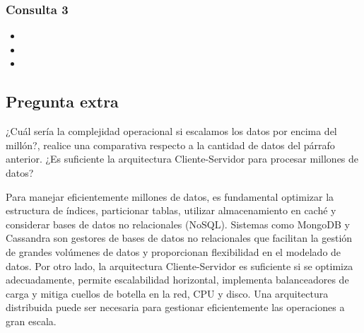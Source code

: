 \subsubsection{Consulta 3}
\begin{itemize}
    \item{}
    \item{}
    \item{}
\end{itemize}
\subsection{Pregunta extra}
¿Cuál sería la complejidad operacional si escalamos los datos por encima del millón?, realice una comparativa respecto a la cantidad de datos del párrafo anterior. ¿Es suficiente la arquitectura Cliente-Servidor para procesar millones de datos?

Para manejar eficientemente millones de datos, es fundamental optimizar la estructura de índices, particionar tablas, utilizar almacenamiento en caché y considerar bases de datos no relacionales (NoSQL). Sistemas como MongoDB y Cassandra son gestores de bases de datos no relacionales que facilitan la gestión de grandes volúmenes de datos y proporcionan flexibilidad en el modelado de datos. Por otro lado, la arquitectura Cliente-Servidor es suficiente si se optimiza adecuadamente, permite escalabilidad horizontal, implementa balanceadores de carga y mitiga cuellos de botella en la red, CPU y disco. Una arquitectura distribuida puede ser necesaria para gestionar eficientemente las operaciones a gran escala.